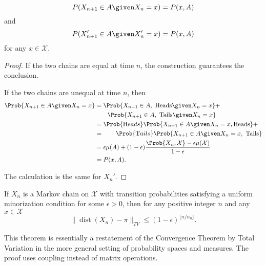 \documentclass[12pt]{article}
\begin{document}
\begin{lemma}
    \[
        P(X_{n+1} \in A \given X_n = x) = P(x,A)
    \] and
    \[
        P(X_{n+1}' \in A \given X_n' = x) = P(x,A)
    \] for any \( x \in \mathcal{X} \).
\end{lemma}

\begin{proof}
    If the two chains are equal at time \( n \), the construction
    guarantees the conclusion.

    If the two chains are unequal at time \( n \), then
    \begin{align*}
        \Prob{X_{n+1} \in A \given X_n = x} &= \Prob{X_{n+1} \in A,\text
        { Heads} \given X_n = x} + \\
        & \qquad \Prob{X_{n+1} \in A,\text{ Tails} \given X_n = x} \\
        &= \Prob{\text Heads} \Prob{X_{n+1} \in A \given X_n = x, \text{%
        Heads}} + \\
        &= \qquad \Prob{\text Tails} \Prob{X_{n+1} \in A \given X_n = x,
        \text{ Tails} } \\
        &= \epsilon \mu(A) + (1-\epsilon) \frac{\Prob{X_n, \mathcal{X}}
        - \epsilon \mu(\mathcal{X})}{1-\epsilon} \\
        &= P(x,A).
    \end{align*}

    The calculation is the same for \( X_n' \).
\end{proof}

\begin{theorem}
    If \( X_n \) is a Markov chain on \( \mathcal{X} \) with transition
    probabilities satisfying a uniform minorization condition for some \(
    \epsilon > 0 \), then for any positive integer \( n \) and any \( x
    \in \mathcal{X} \)
    \[
        \|
        \operatorname{dist}
        (X_n) - \pi \|_{TV} \le (1-\epsilon)^{\lfloor n/n_0 \rfloor}.
    \]
\end{theorem}

\begin{remark}
    This theorem is essentially a restatement of the Convergence Theorem
    by Total Variation in the more general setting of probability spaces
    and measures.  The proof uses coupling instead of matrix operations.
\end{remark}
\end{document}
